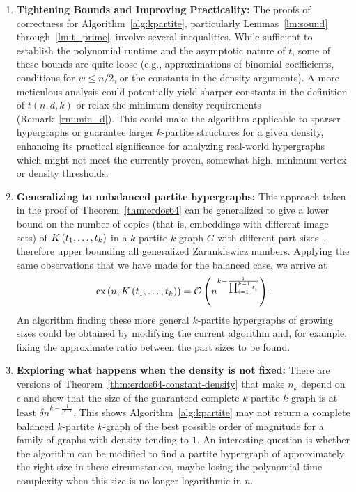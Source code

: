 \begin{enumerate}
    \item \textbf{Tightening Bounds and Improving Practicality:}
    The proofs of correctness for Algorithm~\ref{alg:kpartite}, particularly Lemmas~\ref{lm:sound} through~\ref{lm:t_prime},
    involve several inequalities.
    While sufficient to establish the polynomial runtime and the asymptotic nature of $t$,
    some of these bounds are quite loose (e.g., approximations of binomial coefficients, conditions for $w \leq n/2$,
    or the constants in the density arguments).
    A more meticulous analysis could potentially yield sharper constants in the definition of
    $t(n,d,k)$ or relax the minimum density requirements (Remark~\ref{rm:min_d}).
    This could make the algorithm applicable to sparser hypergraphs or guarantee larger $k$-partite structures for a given density,
    enhancing its practical significance for analyzing real-world hypergraphs which might not meet the currently proven,
    somewhat high, minimum vertex or density thresholds.

    \item \textbf{Generalizing to unbalanced partite hypergraphs:}
    This approach taken in the proof of Theorem~\ref{thm:erdos64}
    can be generalized to give a lower bound on the number of
    copies (that is, embeddings with different image sets)
    of $K\left(t_1, \dots, t_k\right)$ in a $k$-partite $k$-graph $G$
    with different part sizes~\cite{carvajal2024canonical},
    therefore upper bounding all generalized Zarankiewicz numbers.
    Applying the same observations that we have made for the balanced case,
    we arrive at
    \begin{equation} \label{eq:general-partite-bound}
        \text{ex} \left( n, K\left(t_1, \dots, t_k\right) \right) = \mathcal{O}\left(n^{k - \frac{1}{\prod_{i=1}^{k-1} t_i}}\right).
    \end{equation}
    An algorithm finding these more general $k$-partite hypergraphs
    of growing sizes could be obtained by modifying the current algorithm
    and, for example, fixing the approximate ratio between the part sizes to be found.

    \item \textbf{Exploring what happens when the density is not fixed:}
    There are versions of Theorem~\ref{thm:erdos64-constant-density}
    that make $n_k$ depend on $\epsilon$ and show that the size of the
    guaranteed complete $k$-partite $k$-graph is at least $\delta n^{k-\frac{1}{t^{k-1}}}$.
    This shows Algorithm~\ref{alg:kpartite} may not return a complete balanced $k$-partite
    $k$-graph of the best possible order of magnitude for a family of graphs with density tending to $1$.
    An interesting question is whether the algorithm can be modified to find
    a partite hypergraph of approximately the right size in these circumstances,
    maybe losing the polynomial time complexity when this size is no longer logarithmic in $n$.


\end{enumerate}

